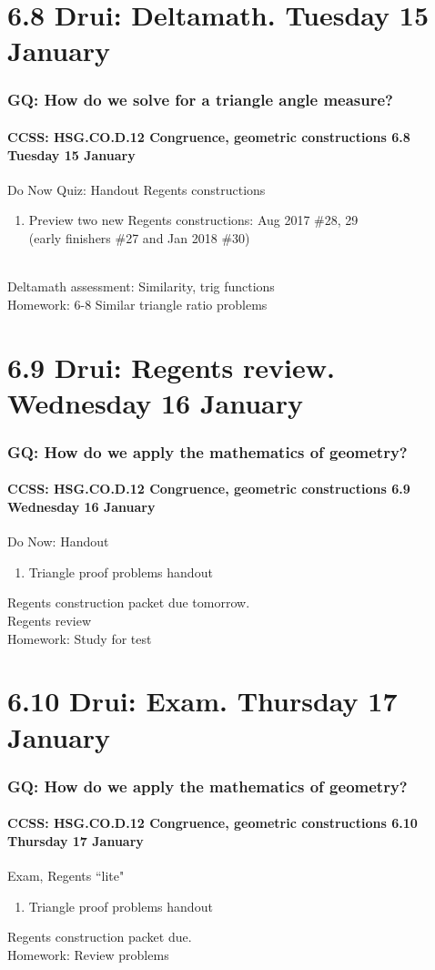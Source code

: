 \documentclass{beamer}
\begin{document}
\section{6.8 Drui: Deltamath. Tuesday 15 January}
  \frame
  {
    \frametitle{GQ: How do we solve for a triangle angle measure?}
    \framesubtitle{CCSS: HSG.CO.D.12 Congruence, geometric constructions  \alert{6.8 Tuesday 15 January}}

    \begin{block}{Do Now Quiz: Handout Regents constructions}
      \begin{enumerate}
        \item Preview two new Regents constructions: Aug 2017 \#28, 29\\ (early finishers \#27 and Jan 2018 \#30)
      \end{enumerate}
    \end{block}
    \\
    Deltamath assessment: Similarity, trig functions\\
    Homework: 6-8 Similar triangle ratio problems
  }

\section{6.9 Drui: Regents review. Wednesday 16 January}
  \frame
  {
    \frametitle{GQ: How do we apply the mathematics of geometry?}
    \framesubtitle{CCSS: HSG.CO.D.12 Congruence, geometric constructions  \alert{6.9 Wednesday 16 January}}

    \begin{block}{Do Now: Handout}
      \begin{enumerate}
        \item Triangle proof problems handout
      \end{enumerate}
    \end{block}
    Regents construction packet due tomorrow.\\
    Regents review\\[0.5cm]
    Homework: Study for test
  }

\section{6.10 Drui: Exam. Thursday 17 January}
  \frame
  {
    \frametitle{GQ: How do we apply the mathematics of geometry?}
    \framesubtitle{CCSS: HSG.CO.D.12 Congruence, geometric constructions  \alert{6.10 Thursday 17 January}}

    \begin{block}{Exam, Regents ``lite"}
      \begin{enumerate}
        \item Triangle proof problems handout
      \end{enumerate}
    \end{block}
    Regents construction packet due.\\[0.5cm]
    Homework: Review problems
  }
\end{document}
